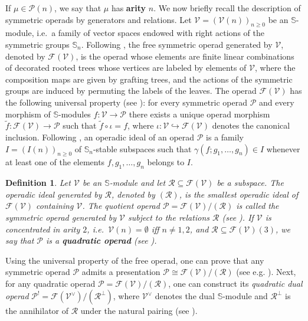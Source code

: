 \documentclass[10pt]{article}
\newtheorem {definition}[lemma] {Definition}
\theoremstyle{definition}
\begin{document}
If $\mu \in \mathcal{P}(n)$, we say that $\mu$ has \textbf{arity} $n$. 
We now briefly recall the description of symmetric operads by generators
and relations.
Let $\mathcal{V}=(\mathcal{V}(n))_{n\geq 0}$ be an $\mathbb S$-module, i.e.\ a family of vector spaces endowed with right actions of the symmetric groups $\mathbb{S}_n$.
Following \cite[1.9]{MSS}, the free symmetric operad generated by $\mathcal{V}$, denoted by $\mathcal{F}(\mathcal{V})$, is the operad whose elements are finite linear combinations of decorated rooted trees whose vertices are labeled by elements of $\mathcal{V}$, where the composition maps are given by grafting trees, and the actions of the symmetric groups are induced by permuting the labels of the leaves. The operad $\mathcal{F}(\mathcal{V})$ has the following universal property (see \cite[5.5]{LodayVallette}): for every symmetric operad $\mathcal P$ and every morphism of $\mathbb S$-modules $f:\mathcal{V}\to \mathcal{P}$
there exists a unique operad morphism $\widetilde f:\mathcal{F}(\mathcal{V})\to \mathcal{P}$
such that $\widetilde f\circ\iota=f$,
where $\iota:\mathcal{V} \hookrightarrow\mathcal{F}(\mathcal{V})$ denotes the canonical
inclusion. Following \cite[5.2.14]{LodayVallette}, an operadic ideal of an operad $\mathcal P$ is a family
$I=(I(n))_{n\ge0}$ of $\mathbb S_n$-stable subspaces such that $\gamma(f;g_1,\ldots,g_n)\in I$
whenever at least one of the elements
$f,g_1,\ldots,g_n$ belongs to $I$.
\begin{definition}
Let $\mathcal{V}$ be an $\mathbb S$-module and let $\mathcal{R}\subseteq \mathcal{F}(\mathcal{V})$
be a subspace. The \emph{operadic ideal generated by $\mathcal{R}$}, denoted by $(\mathcal{R})$, is the smallest operadic ideal of $\mathcal{F}(\mathcal{V})$ containing $\mathcal{V}$.
The quotient operad $\mathcal{P}=\mathcal{F}(\mathcal{V})/(\mathcal{R})$
is called the symmetric operad generated by $\mathcal{V}$ subject to the relations $\mathcal{R}$ (see \cite[5.1]{Felicia}). If $\mathcal{V}$ is concentrated in arity $2$, i.e.\ $\mathcal{V}(n) = \emptyset$ iff $n \neq 1,2$, and  $\mathcal{R} \subseteq \mathcal{F}(\mathcal{V})(3)$, we say that $\mathcal{P}$ is a \textbf{quadratic operad} (see \cite[Definition 3.31]{MSS}).
\end{definition}
Using the universal property of the free operad, one can prove that
any symmetric operad $\mathcal{P}$ admits a presentation $\mathcal{P} \cong \mathcal{F}(\mathcal{V})/(\mathcal{R})$ (see e.g. \cite[Theorem 5.20]{Felicia}). Next, for any quadratic operad $\mathcal{P}=\mathcal{F}(\mathcal{V})/(\mathcal{R})$,
one can construct its \emph{quadratic dual operad} $\mathcal P^!
=
\mathcal F(\mathcal{V}^\vee)/(\mathcal{R}^\perp)$,
where $\mathcal{V}^\vee$ denotes the dual $\mathbb S$-module and
$\mathcal{R}^\perp$ is the annihilator of $\mathcal{R}$ under the natural pairing (see \cite[Definition 3.37]{MSS}).
\end{document}
